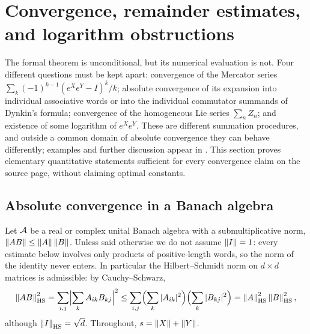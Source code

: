 \section{Convergence, remainder estimates, and logarithm obstructions}\label{sec:convergence}
The formal theorem is unconditional, but its numerical evaluation is not.
Four different questions must be kept apart: convergence of the Mercator
series $\sum_k(-1)^{k-1}(e^Xe^Y-I)^k/k$; absolute convergence of its
expansion into individual associative words or into the individual
commutator summands of Dynkin's formula; convergence of the homogeneous Lie
series $\sum_nZ_n$; and existence of some logarithm of $e^Xe^Y$. These are
different summation procedures, and outside a common domain of absolute
convergence they can behave differently; examples and further discussion
appear in \cite{biagi}. This section proves elementary quantitative
statements sufficient for every convergence claim on the source page,
without claiming optimal constants.

\subsection{Absolute convergence in a Banach algebra}
Let $\mathcal{A}$ be a real or complex unital Banach algebra with a submultiplicative
norm, $\left\lVert AB\right\rVert\leq\left\lVert A\right\rVert\left\lVert B\right\rVert$. Unless said otherwise we do not assume
$\left\lVert I\right\rVert=1$: every estimate below involves only products of positive-length
words, so the norm of the identity never enters. In particular the
Hilbert--Schmidt norm on $d\times d$ matrices is admissible: by
Cauchy--Schwarz,
\[
 \left\lVert AB\right\rVert_{\mathrm{HS}}^2=\sum_{i,j}\Bigl|\sum_kA_{ik}B_{kj}\Bigr|^2
 \leq\sum_{i,j}\Bigl(\sum_k|A_{ik}|^2\Bigr)\Bigl(\sum_k|B_{kj}|^2\Bigr)
 =\left\lVert A\right\rVert_{\mathrm{HS}}^2\left\lVert B\right\rVert_{\mathrm{HS}}^2,
\]
although $\left\lVert I\right\rVert_{\mathrm{HS}}=\sqrt d$. Throughout, $s=\left\lVert X\right\rVert+\left\lVert Y\right\rVert$.

